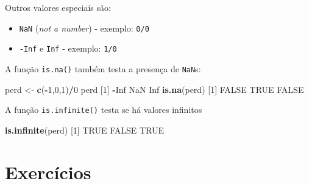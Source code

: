 \documentclass[10pt,a4paper]{book}
\newenvironment{Shaded}{\begin{snugshade}}{\end{snugshade}}
\newcommand{\KeywordTok}[1]{\textcolor[rgb]{0.13,0.29,0.53}{\textbf{#1}}}
\newcommand{\DecValTok}[1]{\textcolor[rgb]{0.00,0.00,0.81}{#1}}
\newcommand{\StringTok}[1]{\textcolor[rgb]{0.31,0.60,0.02}{#1}}
\newcommand{\OtherTok}[1]{\textcolor[rgb]{0.56,0.35,0.01}{#1}}
\newcommand{\OperatorTok}[1]{\textcolor[rgb]{0.81,0.36,0.00}{\textbf{#1}}}
\newcommand{\NormalTok}[1]{#1}
\providecommand{\tightlist}{%
  \setlength{\itemsep}{0pt}\setlength{\parskip}{0pt}}
\begin{document}
Outros valores especiais são:

\begin{itemize}
\tightlist
\item
  \texttt{NaN} (\emph{not a number}) - exemplo: \texttt{0/0}
\item
  \texttt{-Inf} e \texttt{Inf} - exemplo: \texttt{1/0}
\end{itemize}

A função \texttt{is.na()} também testa a presença de \texttt{NaN}s:

\begin{Shaded}
\begin{Highlighting}[]
\NormalTok{perd <-}\StringTok{ }\KeywordTok{c}\NormalTok{(}\OperatorTok{-}\DecValTok{1}\NormalTok{,}\DecValTok{0}\NormalTok{,}\DecValTok{1}\NormalTok{)}\OperatorTok{/}\DecValTok{0}
\NormalTok{perd}
\NormalTok{[}\DecValTok{1}\NormalTok{] }\OperatorTok{-}\OtherTok{Inf}  \OtherTok{NaN}  \OtherTok{Inf}
\KeywordTok{is.na}\NormalTok{(perd)}
\NormalTok{[}\DecValTok{1}\NormalTok{] }\OtherTok{FALSE}  \OtherTok{TRUE} \OtherTok{FALSE}
\end{Highlighting}
\end{Shaded}

A função \texttt{is.infinite()} testa se há valores infinitos

\begin{Shaded}
\begin{Highlighting}[]
\KeywordTok{is.infinite}\NormalTok{(perd)}
\NormalTok{[}\DecValTok{1}\NormalTok{]  }\OtherTok{TRUE} \OtherTok{FALSE}  \OtherTok{TRUE}
\end{Highlighting}
\end{Shaded}

\section*{Exercícios}\label{exercicios-3}
\end{document}
